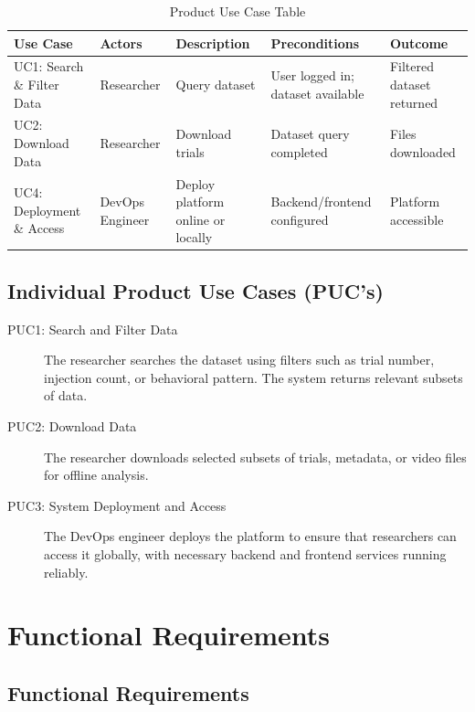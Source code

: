 \documentclass[12pt]{article}
\begin{document}
\begin{table}[H]
\centering
\begin{tabular}{|p{2.5cm}|p{2cm}|p{3.0cm}|p{3.0cm}|p{2.5cm}|}
\hline
\textbf{Use Case} & \textbf{Actors} & \textbf{Description} & \textbf{Preconditions} & \textbf{Outcome} \\
\hline
UC1: Search \& Filter Data & Researcher & Query dataset & User logged in; dataset available & Filtered dataset returned \\
\hline
UC2: Download Data & Researcher & Download trials & Dataset query completed & Files downloaded \\
\hline
UC4: Deployment \& Access & DevOps Engineer & Deploy platform online or locally & Backend/frontend configured & Platform accessible \\
\hline
\end{tabular}
\caption{Product Use Case Table}
\end{table}

\subsection{Individual Product Use Cases (PUC’s)}

\begin{description}
\item[PUC1: Search and Filter Data] The researcher searches the dataset using filters such as trial number, injection count, or behavioral pattern. The system returns relevant subsets of data.
\item[PUC2: Download Data] The researcher downloads selected subsets of trials, metadata, or video files for offline analysis.
\item[PUC3: System Deployment and Access] The DevOps engineer deploys the platform to ensure that researchers can access it globally, with necessary backend and frontend services running reliably.
\end{description}

\section{Functional Requirements}
\subsection{Functional Requirements}
\end{document}

